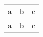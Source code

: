 \documentclass{article}
\begin{document}
\begin{tabular}{l l l}
a & b & c \\
a & b & c
\end{tabular}
\end{document}
